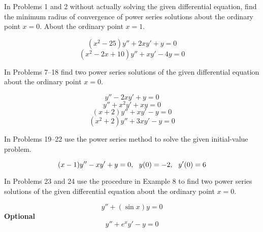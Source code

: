 \documentclass[chapter=6,section=2]{math252homework}
\begin{document}
In Problems 1 and 2 without actually solving the given differential equation, find the minimum radius of convergence of power series solutions about the ordinary point $x=0$. About the ordinary point $x=1.$
\begin{problems}
	\problem \[ (x^{2} - 25)y'' + 2xy' + y = 0 \]							%
	\problem \[ (x^{2}-2x+10)y'' + xy' - 4y = 0 \]							%
\end{problems}

In Problems 7--18 find two power series solutions of the given differential equation about the ordinary point $x=0$.
\begin{problems}[start=9]
    \problem \[ y'' - 2xy' + y = 0 \]										%
	\setcounter{problemsi}{10}
	\problem \[ y'' + x^{2}y' + xy = 0 \]									%
	\setcounter{problemsi}{13}
	\problem \[ (x+2)y'' + xy' - y = 0 \]									%
	\setcounter{problemsi}{16}
	\problem \[ (x^{2}+2)y'' + 3xy' - y = 0 \]								%
\end{problems}

In Problems 19--22 use the power series method to solve the given initial-value problem.
\begin{problems}[start=19]
    \problem \[ (x-1)y'' - xy' + y = 0,\mbox{{ }{ }} y(0)=-2,\mbox{{ }{ }} y'(0)=6 \]	%
\end{problems}

In Problems 23 and 24 use the procedure in Example 8 to find two power series solutions of the given differential equation about the ordinary point $x=0$.
\begin{problems}[start=23]
    \problem \[ y'' + (\sin x)y = 0 \]										%
    \problem \textbf{Optional} \[ y'' + e^{x}y' - y = 0 \]					%
\end{problems}
\end{document}

